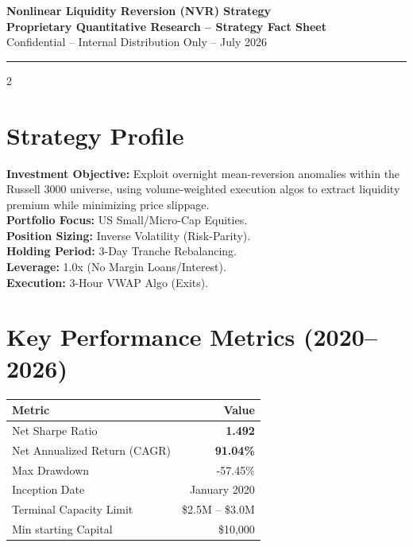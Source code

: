 \documentclass[10pt,a4paper]{article}
\begin{document}
\begin{center}
    {\LARGE \textbf{Nonlinear Liquidity Reversion (NVR) Strategy}} \\
    \vspace{0.05in}
    {\large \textbf{Proprietary Quantitative Research -- Strategy Fact Sheet}} \\
    \vspace{0.05in}
    Confidential -- Internal Distribution Only -- July 2026
\end{center}

\vspace{0.1in}
\hrule
\vspace{0.1in}

\begin{multicols}{2}

\section*{Strategy Profile}
\textbf{Investment Objective:} Exploit overnight mean-reversion anomalies within the Russell 3000 universe, using volume-weighted execution algos to extract liquidity premium while minimizing price slippage.\\
\textbf{Portfolio Focus:} US Small/Micro-Cap Equities.\\
\textbf{Position Sizing:} Inverse Volatility (Risk-Parity).\\
\textbf{Holding Period:} 3-Day Tranche Rebalancing.\\
\textbf{Leverage:} 1.0x (No Margin Loans/Interest).\\
\textbf{Execution:} 3-Hour VWAP Algo (Exits).

\columnbreak

\section*{Key Performance Metrics (2020--2026)}
\begin{tabular}{lr}
\toprule
\textbf{Metric} & \textbf{Value} \\
\midrule
Net Sharpe Ratio & \textbf{1.492} \\
Net Annualized Return (CAGR) & \textbf{91.04\%} \\
Max Drawdown & -57.45\% \\
Inception Date & January 2020 \\
Terminal Capacity Limit & \$2.5M -- \$3.0M \\
Min starting Capital & \$10,000 \\
\bottomrule
\end{tabular}

\end{multicols}
\end{document}
